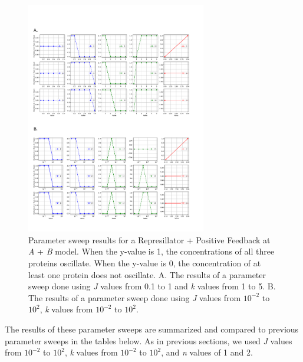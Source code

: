 \documentclass{article}
\begin{document}

\begin{figure}[H]
    \centering
    \includegraphics[width=0.7\textwidth]{figure10.pdf}
    \caption{Parameter sweep results for a Represillator + Positive Feedback at \textit{A} + \textit{B} model. When the y-value is 1, the concentrations of all three proteins oscillate. When the y-value is 0, the concentration of at least one protein does not oscillate. A. The results of a parameter sweep done using \textit{J} values from 0.1 to 1 and \textit{k} values from 1 to 5. B. The results of a parameter sweep done using \textit{J} values from \( 10^{-2} \) to \( 10^{2} \), \textit{k} values from \( 10^{-2} \) to \( 10^{2} \). }
    \label{fig:10}
\end{figure}

The results of these parameter sweeps are summarized and compared to previous parameter sweeps in the tables below. As in previous sections, we used \textit{J} values from \( 10^{-2} \) to \( 10^{2} \), \textit{k} values from \( 10^{-2} \) to \( 10^{2} \), and \textit{n} values of 1 and 2.
\end{document}
